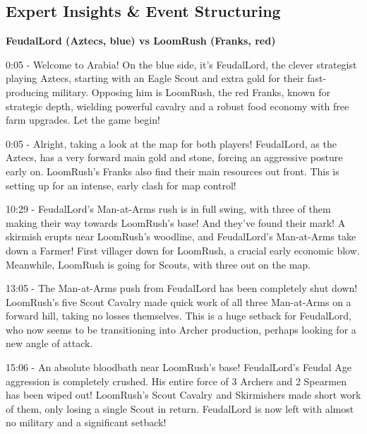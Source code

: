 \subsection{Expert Insights \& Event Structuring}
\textbf{FeudalLord (Aztecs, blue) vs LoomRush (Franks, red)}

0:05 - Welcome to Arabia! On the blue side, it's FeudalLord, the clever strategist playing Aztecs, starting with an Eagle Scout and extra gold for their fast-producing military. Opposing him is LoomRush, the red Franks, known for strategic depth, wielding powerful cavalry and a robust food economy with free farm upgrades. Let the game begin! \par \vspace{1em}

0:05 - Alright, taking a look at the map for both players! FeudalLord, as the Aztecs, has a very forward main gold and stone, forcing an aggressive posture early on. LoomRush's Franks also find their main resources out front. This is setting up for an intense, early clash for map control! \par \vspace{1em}

10:29 - FeudalLord's Man-at-Arms rush is in full swing, with three of them making their way towards LoomRush's base! And they've found their mark! A skirmish erupts near LoomRush's woodline, and FeudalLord's Man-at-Arms take down a Farmer! First villager down for LoomRush, a crucial early economic blow. Meanwhile, LoomRush is going for Scouts, with three out on the map. \par \vspace{1em}

13:05 - The Man-at-Arms push from FeudalLord has been completely shut down! LoomRush's five Scout Cavalry made quick work of all three Man-at-Arms on a forward hill, taking no losses themselves. This is a huge setback for FeudalLord, who now seems to be transitioning into Archer production, perhaps looking for a new angle of attack. \par \vspace{1em}

15:06 - An absolute bloodbath near LoomRush's base! FeudalLord's Feudal Age aggression is completely crushed. His entire force of 3 Archers and 2 Spearmen has been wiped out! LoomRush's Scout Cavalry and Skirmishers made short work of them, only losing a single Scout in return. FeudalLord is now left with almost no military and a significant setback! \par \vspace{1em}

